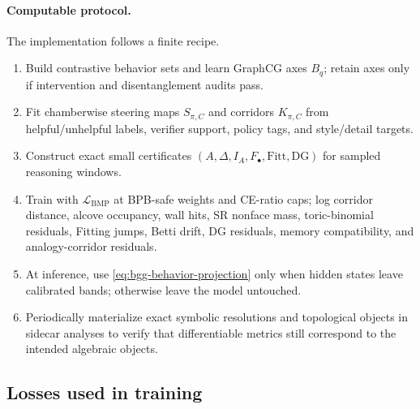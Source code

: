 \documentclass[11pt]{article}
\theoremstyle{definition}
\theoremstyle{plain}
\theoremstyle{remark}
\numberwithin{equation}{section}
\begin{document}
\paragraph{Computable protocol.}
The implementation follows a finite recipe.
\begin{enumerate}[leftmargin=2em]
  \item Build contrastive behavior sets and learn GraphCG axes $B_q$; retain axes only if intervention and disentanglement audits pass.
  \item Fit chamberwise steering maps $S_{\pi,C}$ and corridors $K_{\pi,C}$ from helpful/unhelpful labels, verifier support, policy tags, and style/detail targets.
  \item Construct exact small certificates $(A,\Delta,I_A,F_\bullet,\mathrm{Fitt},\mathrm{DG})$ for sampled reasoning windows.
  \item Train with $\mathcal L_{\mathrm{BMP}}$ at BPB-safe weights and CE-ratio caps; log corridor distance, alcove occupancy, wall hits, SR nonface mass, toric-binomial residuals, Fitting jumps, Betti drift, DG residuals, memory compatibility, and analogy-corridor residuals.
  \item At inference, use \eqref{eq:bgg-behavior-projection} only when hidden states leave calibrated bands; otherwise leave the model untouched.
  \item Periodically materialize exact symbolic resolutions and topological objects in sidecar analyses to verify that differentiable metrics still correspond to the intended algebraic objects.
\end{enumerate}

\subsection{Losses used in training}
\end{document}
